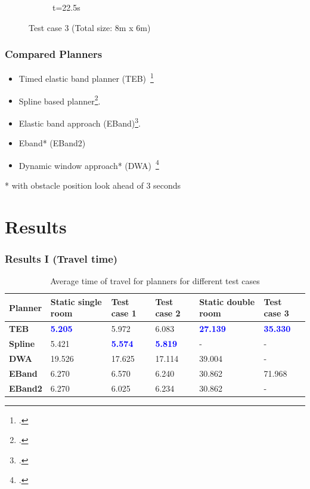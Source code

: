 \documentclass{beamer}
\begin{document}
\begin{frame}
\begin{figure}[H]
\begin{subfigure}[b]{0.35\linewidth}
            \caption{t=22.5s}
        \end{subfigure}
        \caption{Test case 3 (Total size: 8m x 6m)}\label{fig:double_room}
    \end{figure}
\end{frame}

\begin{frame}
    \frametitle{\huge{Compared Planners}}
    \begin{itemize}
        \item Timed elastic band planner (TEB)~\footcite{rosmann2015planning}
        \item Spline based planner\footcite{mercy2017spline}.
        \item Elastic band approach (EBand)\footcite{quinlan1993elastic}.
        \item Eband* (EBand2)
        \item Dynamic window approach* (DWA)~\footcite{fox1997dynamic}
    \end{itemize}
    \tiny{* with obstacle position look ahead of 3 seconds}
\end{frame}

\section{Results}
\begin{frame}
    \frametitle{\huge{Results I (Travel time)}}
    \begin{table}[!htpb]
        \centering
        \begin{tabular}{p{1.5cm}p{1.3cm}p{1.3cm}p{1.3cm}p{1.3cm}p{1.3cm}}\toprule
            \textbf{Planner} & \textbf{Static single room} & \textbf{Test case 1} & \textbf{Test case 2} & \textbf{Static double room} & \textbf{Test case 3} \\\toprule
            \textbf{TEB    } & \textcolor{blue}{\textbf{5.205}}  & 5.972  & 6.083  & \textcolor{blue}{\textbf{27.139}} & \textcolor{blue}{\textbf{35.330}} \\\midrule
            \textbf{Spline } & 5.421  & \textcolor{blue}{\textbf{5.574}}  & \textcolor{blue}{\textbf{5.819}}  & \--    & \--    \\\midrule     
            \textbf{DWA    } & 19.526 & 17.625 & 17.114 & 39.004 & \-- \\\midrule
            \textbf{EBand  } & 6.270  & 6.570  & 6.240  & 30.862 & 71.968 \\\midrule
            \textbf{EBand2 } & 6.270  & 6.025  & 6.234  & 30.862 & \-- \\
            \bottomrule
        \end{tabular}
        \caption{Average time of travel for planners for different test cases}
    \end{table}
\end{frame}
\end{document}
